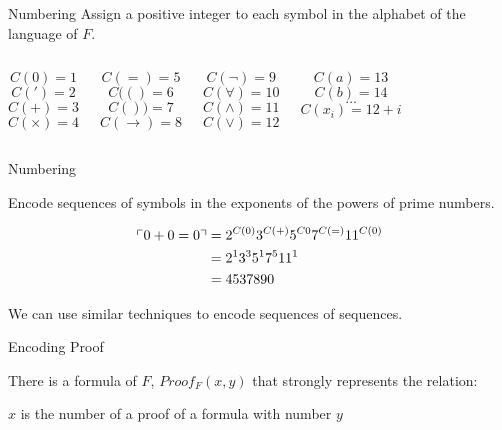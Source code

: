 \documentclass{beamer}
\begin{document}
\begin{frame}{\godel{} Numbering}
  Assign a positive integer to each symbol in the alphabet of the
  language of $F$.

  \begin{columns}[T]
    $$C(0) = 1$$
    $$C(') = 2$$
    $$C(+) = 3$$
    $$C(\times) = 4$$


    $$C(=) = 5$$
    $$C(() = 6$$
    $$C()) = 7$$
    $$C(\rightarrow) = 8$$


    $$C(\neg) = 9$$
    $$C(\forall) = 10$$
    $$C(\land) = 11$$
    $$C(\lor) = 12$$


    $$C(a) = 13$$
    $$C(b) = 14$$
    $$\dots$$
    $$C(x_i) = 12 + i$$

  \end{columns}

\end{frame}

\begin{frame}{\godel{} Numbering}

  Encode sequences of symbols in the exponents of the powers of prime numbers.

  \begin{align*}
    \ulcorner 0 + 0 = 0 \urcorner &= 2^{C(0)}3^{C(+)}5^{C{0}}7^{C(=)}11^{C(0)} \\
                     &= 2^13^35^17^511^1 \\
                     &= 4537890
  \end{align*}

  \pause

  We can use similar techniques to encode sequences of sequences.

\end{frame}

\begin{frame}{Encoding Proof}

  \begin{theorem}

    There is a formula of $F$, $Proof_F(x, y)$ that strongly represents the
    relation:

    $x$ is the \godel{} number of a proof of a formula with \godel{} number $y$

  \end{theorem}

\end{frame}
\end{document}
